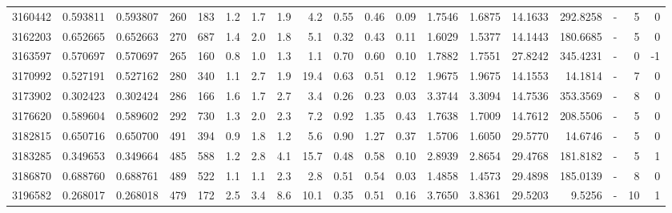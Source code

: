 \begin{tabular}{rrrrrrrrrrrrrrrrlrr}
   3160442 & 0.593811 &   0.593807 &  260 &  183 &      1.2 &      1.7 &     1.9 &      4.2 &       0.55 &        0.46 &        0.09 &  1.7546 &  1.6875 &   14.1633 &  292.8258 &             - &        5 &          0 \\
   3162203 & 0.652665 &   0.652663 &  270 &  687 &      1.4 &      2.0 &     1.8 &      5.1 &       0.32 &        0.43 &        0.11 &  1.6029 &  1.5377 &   14.1443 &  180.6685 &             - &        5 &          0 \\
   3163597 & 0.570697 &   0.570697 &  265 &  160 &      0.8 &      1.0 &     1.3 &      1.1 &       0.70 &        0.60 &        0.10 &  1.7882 &  1.7551 &   27.8242 &  345.4231 &             - &        0 &         -1 \\
   3170992 & 0.527191 &   0.527162 &  280 &  340 &      1.1 &      2.7 &     1.9 &     19.4 &       0.63 &        0.51 &        0.12 &  1.9675 &  1.9675 &   14.1553 &   14.1814 &             - &        7 &          0 \\
   3173902 & 0.302423 &   0.302424 &  286 &  166 &      1.6 &      1.7 &     2.7 &      3.4 &       0.26 &        0.23 &        0.03 &  3.3744 &  3.3094 &   14.7536 &  353.3569 &             - &        8 &          0 \\
   3176620 & 0.589604 &   0.589602 &  292 &  730 &      1.3 &      2.0 &     2.3 &      7.2 &       0.92 &        1.35 &        0.43 &  1.7638 &  1.7009 &   14.7612 &  208.5506 &             - &        5 &          0 \\
   3182815 & 0.650716 &   0.650700 &  491 &  394 &      0.9 &      1.8 &     1.2 &      5.6 &       0.90 &        1.27 &        0.37 &  1.5706 &  1.6050 &   29.5770 &   14.6746 &             - &        5 &          0 \\
   3183285 & 0.349653 &   0.349664 &  485 &  588 &      1.2 &      2.8 &     4.1 &     15.7 &       0.48 &        0.58 &        0.10 &  2.8939 &  2.8654 &   29.4768 &  181.8182 &             - &        5 &          1 \\
   3186870 & 0.688760 &   0.688761 &  489 &  522 &      1.1 &      1.1 &     2.3 &      2.8 &       0.51 &        0.54 &        0.03 &  1.4858 &  1.4573 &   29.4898 &  185.0139 &             - &        8 &          0 \\
   3196582 & 0.268017 &   0.268018 &  479 &  172 &      2.5 &      3.4 &     8.6 &     10.1 &       0.35 &        0.51 &        0.16 &  3.7650 &  3.8361 &   29.5203 &    9.5256 &             - &       10 &          1 \\

\end{tabular}
